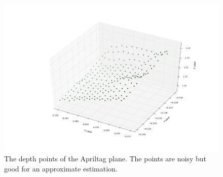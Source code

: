 \begin{figure}
\centering
\includegraphics[width=\columnwidth]{figs/depth_plane_fig}
\caption{The depth points of the Apriltag plane. The points are noisy but good for an approximate estimation.}
\label{fig:calib}
\end{figure}

